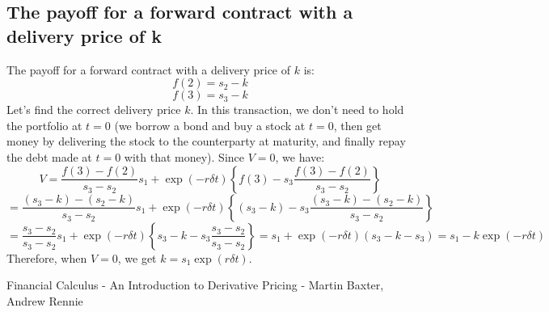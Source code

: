 \documentclass[uplatex,a4j,12pt,dvipdfmx]{jsarticle}
\begin{document}
\subsection{The payoff for a forward contract with a delivery price of k}
The payoff for a forward contract with a delivery price of $k$ is:
\[f(2) = s_2 - k\]
\[f(3) = s_3 - k\]
Let's find the correct delivery price $k$. In this transaction, we don't need to hold the portfolio at $t=0$ (we borrow a bond and buy a stock at $t=0$, then get money by delivering the stock to the counterparty at maturity, and finally repay the debt made at $t=0$ with that money). Since $V=0$, we have:
\[V = \frac{f(3) - f(2)}{s_3 - s_2} s_1 + \exp(-r\delta t) \left\{ f(3) - s_3 \frac{f(3) - f(2)}{s_3 - s_2} \right\} \]
\[
	= \frac{(s_3-k) - (s_2-k)}{s_3 - s_2} s_1 + \exp(-r\delta t) \left\{ (s_3-k) - s_3 \frac{(s_3-k) - (s_2-k)}{s_3 - s_2} \right\}\]
\[= \frac{s_3 - s_2}{s_3 - s_2} s_1 + \exp(-r\delta t) \left\{ s_3 - k - s_3 \frac{s_3 - s_2}{s_3 - s_2} \right\} = s_1 + \exp(-r\delta t) (s_3 - k - s_3) = s_1 - k \exp(-r\delta t)\]
Therefore, when $V=0$, we get $k = s_1 \exp(r\delta t)$.

\begin{thebibliography}{9}
	Financial Calculus - An Introduction to Derivative Pricing - Martin Baxter, Andrew Rennie
\end{thebibliography}
\end{document}
